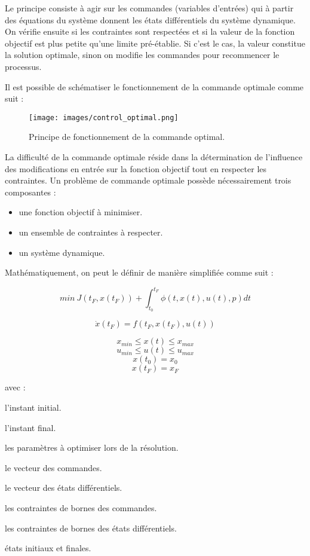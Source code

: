 Le principe consiste à agir sur les commandes (variables d’entrées) qui à partir des équations du système donnent les états différentiels du système dynamique. On vérifie ensuite si les contraintes sont respectées
et si la valeur de la fonction objectif est plus petite qu’une limite pré-établie. Si c’est le cas, la valeur constitue la solution optimale, sinon on modifie les commandes pour recommencer le processus.

Il est possible de schématiser le fonctionnement de la commande optimale comme suit :

\begin{figure}[H]
\begin{center}
\texttt{[image: images/control\_optimal.png]}
\caption{Principe de fonctionnement de la commande optimal.}
\end{center}
\end{figure}

La difficulté de la commande optimale réside dans la détermination de l’influence des modifications en entrée sur la fonction objectif tout en respecter les contraintes.
Un problème de commande optimale possède nécessairement trois composantes :
\begin{itemize}
\setlength\itemsep{-0.5em}
\item une fonction objectif à minimiser.
\item un ensemble de contraintes à respecter.
\item un système dynamique.
\end{itemize}


Mathématiquement, on peut le définir de manière simplifiée comme suit :

\begin{description}
\setlength\itemsep{-0.5em}
\item[Fonction objectif :] \[min\ J(t_{F} , x(t_{F})) + \int_{t_{0}}^{t_{F}} { \phi (t, x(t), u(t), p)dt} \]
\item[Contraintes dynamique :] \[\dot{x}(t_{F}) = f (t_{F} , x(t_{F}), u(t)) \]
\item[Contraintes de bornes :] \[x_{min} \leq x(t) \leq x_{max} \]  \[u_{min} \leq u(t) \leq u_{max} \] \[x(t_{0}) = x_{0}\] \[x(t_{F}) = x_{F}\]
\end{description}

avec :
\begin{description}
\setlength\itemsep{-0.5em}
\item[t$_{\text{0}}$ :] l’instant initial.
\item[t$_{\text{F}}$ :] l’instant final.
\item[p :] les paramètres à optimiser lors de la résolution.
\item[u :] le vecteur des commandes.
\item[x :] le vecteur des états différentiels.
\item[u$_{\text{min}}$, u$_{\text{max}}$ :] les contraintes de bornes des commandes.
\item[x$_{\text{min}}$, x$_{\text{max}}$ :] les contraintes de bornes des états différentiels.
\item[x$_{\text{0}}$, x$_{\text{F}}$ :] états initiaux et finales.
\end{description}


